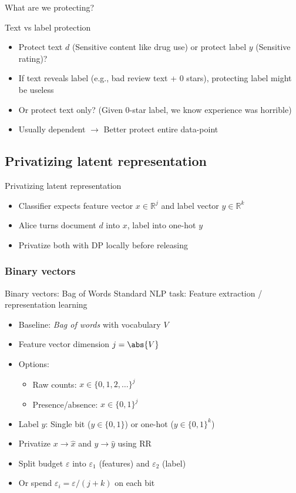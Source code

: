 \documentclass[12pt,aspectratio=169,handout]{beamer}
\begin{document}
\begin{frame}{What are we protecting?}
\begin{block}{Text vs label protection}
\begin{itemize}
\item Protect text $d$ (Sensitive content like drug use) or protect label $y$ (Sensitive rating)?
\item If text reveals label (e.g., bad review text + 0 stars), protecting label might be useless
\item Or protect text only? (Given 0-star label, we know experience was horrible)
\item Usually dependent $\rightarrow$ Better protect entire data-point
\end{itemize}
\end{block}
\end{frame}


\subsection{Privatizing latent representation}

\begin{frame}{Privatizing latent representation}
\begin{itemize}
\item Classifier expects feature vector $x \in \mathbb{R}^j$ and label vector $y \in \mathbb{R}^k$
\item Alice turns document $d$ into $x$, label into one-hot $y$
\item Privatize both with DP locally before releasing
\end{itemize}
\end{frame}

\subsubsection{Binary vectors}

\begin{frame}{Binary vectors: Bag of Words}
Standard NLP task: Feature extraction / representation learning
\begin{itemize}
\item Baseline: \emph{Bag of words} with vocabulary $V$
\item Feature vector dimension $j = \abs{V}$
\item Options:
\begin{itemize}
\item Raw counts: $x \in \{0, 1, 2, \ldots\}^j$
\item Presence/absence: $x \in \{0, 1\}^j$
\end{itemize}
\item Label $y$: Single bit ($y \in \{0, 1\}$) or one-hot ($y \in \{0, 1\}^k$)
\item Privatize $x \to \hat{x}$ and $y \to \hat{y}$ using RR
\item Split budget $\varepsilon$ into $\varepsilon_1$ (features) and $\varepsilon_2$ (label)
\item Or spend $\varepsilon_i = \varepsilon / (j + k)$ on each bit
\end{itemize}
\end{frame}
\end{document}
